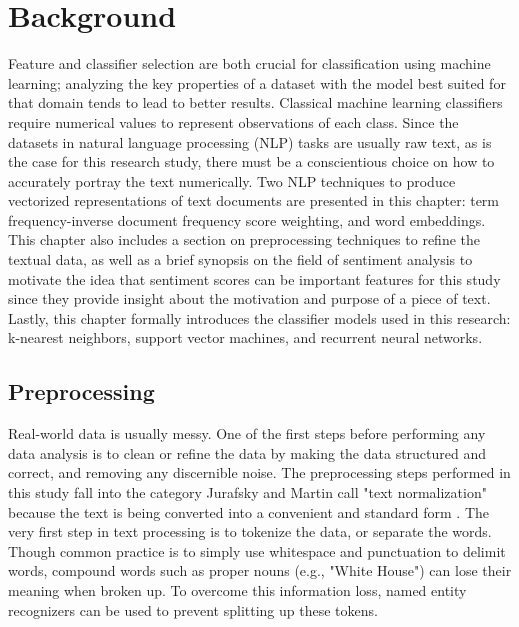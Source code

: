 \chapter{Background}

Feature and classifier selection are both crucial for classification using machine learning; analyzing the key properties of a dataset with the model best suited for that domain tends to lead to better results.  Classical machine learning classifiers require numerical values to represent observations of each class.  Since the datasets in natural language processing (NLP) tasks are usually raw text, as is the case for this research study, there must be a conscientious choice on how to accurately portray the text numerically.  Two NLP techniques to produce vectorized representations of text documents are presented in this chapter: term frequency-inverse document frequency score weighting, and word embeddings.  This chapter also includes a section on preprocessing techniques to refine the textual data, as well as a brief synopsis on the field of sentiment analysis to motivate the idea that sentiment scores can be important features for this study since they provide insight about the motivation and purpose of a piece of text.  Lastly, this chapter formally introduces the classifier models used in this research: k-nearest neighbors, support vector machines, and recurrent neural networks.


\section{Preprocessing} \label{preprocessingSection}
Real-world data is usually messy.  One of the first steps before performing any data analysis is to clean or refine the data by making the data structured and correct, and removing any discernible noise.  The preprocessing steps performed in this study fall into the category Jurafsky and Martin call "text normalization" because the text is being converted into a convenient and standard form \cite{preprocessing}.  The very first step in text processing is to tokenize the data, or separate the words.  Though common practice is to simply use whitespace and punctuation to delimit words, compound words such as proper nouns (e.g., "White House") can lose their meaning when broken up.  To overcome this information loss, named entity recognizers can be used to prevent splitting up these tokens.

